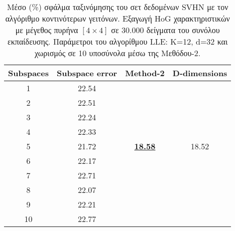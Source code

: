 \begin{table}[H]
\singlespacing
\centering
\label{tab:table17}
\caption{Μέσο (\%) σφάλμα ταξινόμησης του σετ δεδομένων \textlatin{SVHN} με τον αλγόριθμο κοντινότερων γειτόνων. Εξαγωγή \textlatin{HoG} χαρακτηριστικών με μέγεθος πυρήνα $[4\times4]$ σε 30.000 δείγματα του συνόλου εκπαίδευσης. Παράμετροι του αλγορίθμου \textlatin{LLE: K=12, d=32} και χωρισμός σε 10 υποσύνολα μέσω της Μεθόδου-2. }
\vspace*{5mm}
\begin{tabular}{|c|c|c|c|}
\hline
\textlatin{Subspaces} & \textlatin{Subspace error} & \textlatin{Method-2} & \textlatin{D-dimensions}  \\
\hline
1 & 22.54 & & \\
2 & 22.51 & & \\
3 & 22.24 & & \\
4 & 22.33 & & \\
5 & 21.72 & \underline{\textbf{18.58}} & 18.52 \\
6 & 22.17 & & \\
7 & 22.71 & & \\
8 & 22.07 & & \\
9 & 22.21 & & \\
10 & 22.77 & & \\
\hline
\end{tabular}
\end{table}

